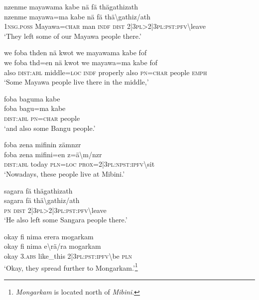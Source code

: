 \ea\label{ex:1:a3634}
nzenme mayawama kabe nä fä thägathizath\\
\gll nzenme	mayawa=ma	kabe	nä	fä	thä{\textbackslash}gathiz/ath\\
     1\textsc{nsg}.\textsc{poss}	Mayawa=\textsc{char}	man	\textsc{indf}	\textsc{dist}	2|3\textsc{pl}>2|3\textsc{pl}:\textsc{pst}:\textsc{pfv}{\textbackslash}leave\\
\glt `They left some of our Mayawa people there.'
\z

\ea\label{ex:1:a3635}
we foba thden nä kwot we mayawama kabe fof\\
\gll we	foba	thd=en	nä	kwot	we	mayawa=ma	kabe	fof\\
     also	\textsc{dist}:\textsc{abl}	middle=\textsc{loc}	\textsc{indf}	properly	also	\textsc{pn}=\textsc{char}	people	\textsc{emph}\\
\glt `Some Mayawa people live there in the middle,'
\z

\ea\label{ex:1:a3637}
foba baguma kabe\\
\gll foba	bagu=ma	kabe\\
     \textsc{dist}:\textsc{abl}	\textsc{pn}=\textsc{char}	people\\
\glt `and also some Bangu people.'
\z

\ea\label{ex:1:a3640}
foba zena mifinin zämnzr\\
\gll foba	zena	mifini=en	z=ä{\textbackslash}m/nzr\\
     \textsc{dist}:\textsc{abl}	today	\textsc{pln}=\textsc{loc}	\textsc{prox}=2|3\textsc{pl}:\textsc{npst}:\textsc{ipfv}{\textbackslash}sit\\
\glt `Nowadays, these people live at Mibini.'
\z

\ea\label{ex:1:a3642}
sagara fä thägathizath\\
\gll sagara	fä	thä{\textbackslash}gathiz/ath\\
     \textsc{pn}	\textsc{dist}	2|3\textsc{pl}>2|3\textsc{pl}:\textsc{pst}:\textsc{pfv}{\textbackslash}leave\\
\glt `He also left some Sangara people there.'
\z

\ea\label{ex:1:a3643}
okay fi nima erera mogarkam\\
\gll okay	fi	nima	e{\textbackslash}rä/ra	mogarkam\\
     okay	3.\textsc{abs}	like\_this	2|3\textsc{pl}:\textsc{pst}:\textsc{ipfv}{\textbackslash}be	\textsc{pln}\\
\glt `Okay, they spread further to Mongarkam.'\footnote{\textit{Mongarkam} is located north of \textit{Mibini}.}
\z

